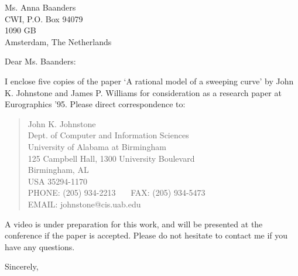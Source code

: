 \address{\ \ }
\signature{Prof. John K. Johnstone}

\begin{letter}
{Ms. Anna Baanders\\
CWI, P.O. Box 94079\\
1090 GB\\
Amsterdam, The Netherlands
}

\opening{Dear Ms. Baanders:}

I enclose five copies of the paper `A rational model of a sweeping curve'
by John K. Johnstone and James P. Williams
for consideration as a research paper at Eurographics '95.
Please direct correspondence to:
	
\begin{quote}
	John K. Johnstone\\
	Dept. of Computer and Information Sciences\\
	University of Alabama at Birmingham\\
	125 Campbell Hall, 1300 University Boulevard\\
	Birmingham, AL\\
	USA   35294-1170\\
	PHONE: (205) 934-2213 \ \ \ FAX: (205) 934-5473\\
	EMAIL: johnstone@cis.uab.edu
\end{quote}

A video is under preparation for this work,
and will be presented at the conference if the paper is accepted.
Please do not hesitate to contact me if you have any questions.

\closing{Sincerely,}
\end{letter}

